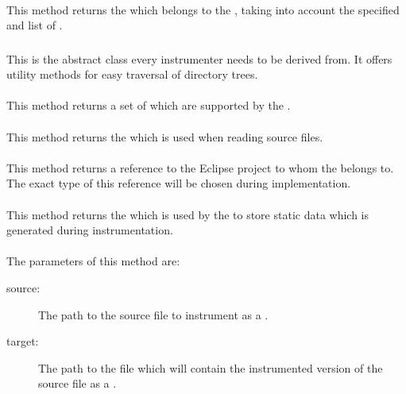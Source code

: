 \paragraph{} \label{Classes:Instrumentation:DefaultInstrumenterFactory:getInstrumenter}
This method returns the  which belongs to the , taking into account the specified  and list of .

\subsubsection{} \label{Classes:Instrumentation:Instrumenter}

This is the abstract class every instrumenter needs to be derived from. It offers utility methods for easy traversal of directory trees.
\paragraph{} \label{Classes:Instrumentation:Instrumenter:getCriteria}
This method returns a set of  which are supported by the .
\paragraph{} \label{Classes:Instrumentation:Instrumenter:getCharset}
This method returns the  which is used when reading source files.
\paragraph{} \label{Classes:Instrumentation:Instrumenter:getProject}
This method returns a reference to the Eclipse project to whom the  belongs to. The exact type of this reference will be chosen during implementation.
\paragraph{} \label{Classes:Instrumentation:Instrumenter:getDatabase}
This method returns the  which is used by the  to store static data which is generated during instrumentation.
\paragraph{} \label{Classes:Instrumentation:Instrumenter:instrument}
The parameters of this method are:
\begin{description}
\item[source:] The path to the source file to instrument as a .
\item[target:] The path to the file which will contain the instrumented version of the source file as a .
\end{description}
